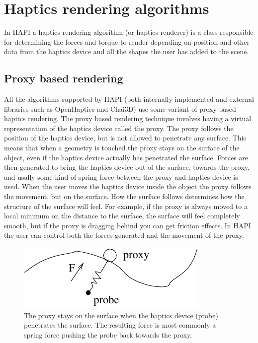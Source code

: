 
\chapter {Haptics rendering algorithms}
In HAPI a haptics rendering algorithm (or haptics renderer) is a class
responsible for determining the forces and torque to render depending
on position and other data from the haptics device and all the shapes
the user has added to the scene. 

\section{Proxy based rendering}
All the algorithms supported by HAPI (both internally implemented and
external libraries such as OpenHaptics and Chai3D) use some variant of
proxy based haptics rendering. The proxy based rendering technique
involves having a virtual representation of the haptics device called
the proxy. The proxy follows the position of the haptics device, but
is not allowed to penetrate any surface. This means that when a
geometry is touched the proxy stays on the surface of the object, even
if the haptics device actually has penetrated the surface. Forces are
then generated to bring the haptics device out of the surface, towards
the proxy, and usally some kind of spring force between the proxy and
haptics device is used. When the user moves the haptics device inside
the object the proxy follows the movement, but on the surface. How the
surface follows determines how the structure of the surface will
feel. For example, if the proxy is always moved to a local minimum on
the distance to the surface, the surface will feel completely smooth,
but if the proxy is dragging behind you can get friction effects. In
HAPI the user can control both the forces generated and the movement
of the proxy.

\begin{figure} 
  \centering 
  \includegraphics{images/proxyfinger.pdf}
  \caption{The proxy stays on the surface when the haptics
  device (probe) penetrates the surface. The resulting force is most
  commonly a spring force pushing the probe back towards the proxy.} 
  \label{Proxy-probe} 
\end{figure}



